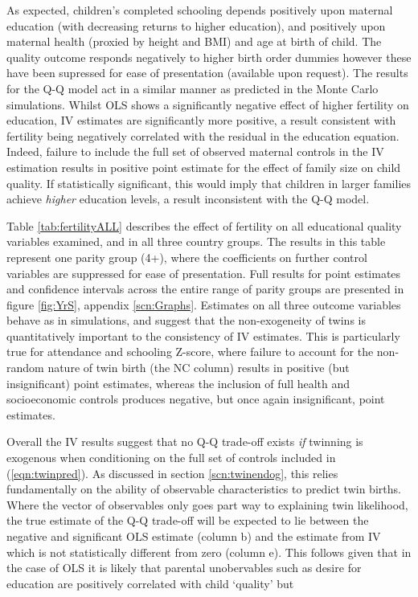 \documentclass{article}[11pt,subeqn]
\begin{document}
\begin{spacing}{1.5}

As expected, children's completed schooling depends positively upon maternal education (with decreasing returns to higher education), 
and positively upon maternal health (proxied by height and BMI) and age at birth of child.  The quality outcome responds negatively to higher birth order dummies
however these have been supressed for ease of presentation (available upon request).  The results for the Q-Q model act in a similar manner as predicted in the Monte
Carlo simulations.  Whilst OLS shows a significantly negative effect of higher fertility on education, IV estimates are significantly more positive, a result consistent with
fertility being negatively correlated with the residual in the education equation.  Indeed, failure to 
include the full set of observed maternal controls in the IV estimation results in positive point estimate for the effect of family size on child quality. 
If statistically significant, this would imply that children in larger families achieve \emph{higher} education levels, a result inconsistent with the Q-Q model.


Table \ref{tab:fertilityALL} describes the effect of fertility on all educational quality variables examined, and in all three country groups.  The results in this table 
represent one parity group (4+), where the coefficients on further control variables are suppressed for ease of presentation.  Full results for point estimates and 
confidence intervals across the entire range of parity groups are presented in figure \ref{fig:YrS}, appendix \ref{scn:Graphs}. Estimates on all three outcome 
variables behave as in simulations, and suggest that the non-exogeneity of twins is quantitatively important to the consistency of IV estimates.  This is particularly 
true for attendance and schooling Z-score, where failure to account for the non-random nature of twin birth (the NC column) results in positive (but insignificant) 
point estimates, whereas the inclusion of full health and socioeconomic controls produces negative, but once again insignificant, point estimates.

Overall the IV results suggest that no Q-Q trade-off exists \emph{if} twinning is exogenous when conditioning on the full set of controls included in (\ref{eqn:twinpred}).  
As discussed in section \ref{scn:twinendog}, this relies fundamentally on the ability of observable characteristics to predict twin births.  Where the vector of observables 
only goes part way to explaining twin likelihood, the true estimate of the Q-Q trade-off will be expected to lie between the negative and significant OLS estimate (column b) 
and the estimate from IV which is not statistically different from zero (column e).  This follows given that in the case of OLS it is likely that parental unobervables such as 
desire for education are positively correlated with child `quality' but 



\end{spacing}
\end{document}
